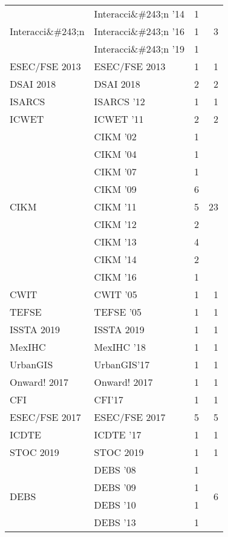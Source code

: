 \begin{table*}[t]
\begin{tabular}{llrr}
\multirow{3}{*}{Interacci\&\#243;n } & Interacci\&\#243;n '14 & 1 & \multirow{3}{*}{3}\\
& Interacci\&\#243;n '16 & 1 &\\
& Interacci\&\#243;n '19 & 1 &\\
\multirow{1}{*}{ESEC/FSE 2013} & ESEC/FSE 2013 & 1 & \multirow{1}{*}{1}\\
\multirow{1}{*}{DSAI 2018} & DSAI 2018 & 2 & \multirow{1}{*}{2}\\
\multirow{1}{*}{ISARCS } & ISARCS '12 & 1 & \multirow{1}{*}{1}\\
\multirow{1}{*}{ICWET } & ICWET '11 & 2 & \multirow{1}{*}{2}\\
\multirow{9}{*}{CIKM } & CIKM '02 & 1 & \multirow{9}{*}{23}\\
& CIKM '04 & 1 &\\
& CIKM '07 & 1 &\\
& CIKM '09 & 6 &\\
& CIKM '11 & 5 &\\
& CIKM '12 & 2 &\\
& CIKM '13 & 4 &\\
& CIKM '14 & 2 &\\
& CIKM '16 & 1 &\\
\multirow{1}{*}{CWIT } & CWIT '05 & 1 & \multirow{1}{*}{1}\\
\multirow{1}{*}{TEFSE } & TEFSE '05 & 1 & \multirow{1}{*}{1}\\
\multirow{1}{*}{ISSTA 2019} & ISSTA 2019 & 1 & \multirow{1}{*}{1}\\
\multirow{1}{*}{MexIHC } & MexIHC '18 & 1 & \multirow{1}{*}{1}\\
\multirow{1}{*}{UrbanGIS} & UrbanGIS'17 & 1 & \multirow{1}{*}{1}\\
\multirow{1}{*}{Onward! 2017} & Onward! 2017 & 1 & \multirow{1}{*}{1}\\
\multirow{1}{*}{CFI} & CFI'17 & 1 & \multirow{1}{*}{1}\\
\multirow{1}{*}{ESEC/FSE 2017} & ESEC/FSE 2017 & 5 & \multirow{1}{*}{5}\\
\multirow{1}{*}{ICDTE } & ICDTE '17 & 1 & \multirow{1}{*}{1}\\
\multirow{1}{*}{STOC 2019} & STOC 2019 & 1 & \multirow{1}{*}{1}\\
\multirow{5}{*}{DEBS } & DEBS '08 & 1 & \multirow{5}{*}{6}\\
& DEBS '09 & 1 &\\
& DEBS '10 & 1 &\\
& DEBS '13 & 1 &\\

\end{tabular}
\end{table*}
